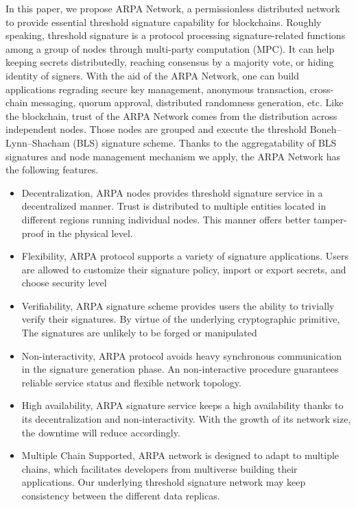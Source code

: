 \documentclass[11pt]{article}
\begin{document}
In this paper, we propose ARPA Network, a permissionless distributed network to provide essential threshold signature capability for blockchains. Roughly speaking, threshold signature is a protocol processing signature-related functions among a group of nodes through multi-party computation (MPC). It can help keeping secrets distributedly, reaching consensus by a majority vote, or hiding identity of signers. With the aid of the ARPA Network, one can build applications regrading secure key management, anonymous transaction, cross-chain messaging, quorum approval, distributed randomness generation, etc. Like the blockchain, trust of the ARPA Network comes from the distribution across independent nodes. Those nodes are grouped and execute the threshold Boneh–Lynn–Shacham (BLS) signature scheme. Thanks to the aggregatability of BLS signatures and node management mechanism we apply, the ARPA Network has the following features.
\begin{itemize}
    \item Decentralization, ARPA nodes provides threshold signature service in a decentralized manner. Trust is distributed to multiple entities located in different regions running individual nodes. This manner offers better tamper-proof in the physical level.
    \item Flexibility, ARPA protocol supports a variety of signature applications. Users are allowed to customize their signature policy, import or export secrets, and choose security level
    \item Verifiability, ARPA signature scheme provides users the ability to trivially verify their signatures. By virtue of the underlying cryptographic primitive, The signatures are unlikely to be forged or manipulated
    \item Non-interactivity, ARPA protocol avoids heavy synchronous communication in the signature generation phase. An non-interactive procedure guarantees reliable service status and flexible network topology.
    \item High availability, ARPA signature service keeps a high availability thanks to its decentralization and non-interactivity. With the growth of its network size, the downtime will reduce accordingly.
    \item Multiple Chain Supported, ARPA network is designed to adapt to multiple chains, which facilitates developers from multiverse building their applications. Our underlying threshold signature network may keep consistency between the different data replicas.
\end{itemize}
\end{document}

